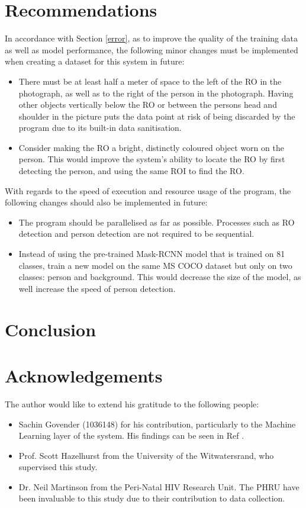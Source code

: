 \documentclass[conference]{IEEEtran}
\begin{document}
\section{Recommendations}
In accordance with Section \ref{error}, as to improve the quality of the training data as well as model performance, the following minor changes must be implemented when creating a dataset for this system in future:
\begin{itemize}
	\item There must be at least half a meter of space to the left of the RO in the photograph, as well as to the right of the person in the photograph.
	Having other objects vertically below the RO or between the persons head and shoulder in the picture puts the data point at risk of being discarded by the program due to its built-in data sanitisation.
	\item Consider making the RO a bright, distinctly coloured object worn on the person.
	This would improve the system's ability to locate the RO by first detecting the person, and using the same ROI to find the RO.
\end{itemize}
With regards to the speed of execution and resource usage of the program, the following changes should also be implemented in future:
\begin{itemize}
	\item The program should be parallelised as far as possible.
	Processes such as RO detection and person detection are not required to be sequential.
	\item Instead of using the pre-trained Mask-RCNN model that is trained on 81 classes, train a new model on the same MS COCO dataset but only on two classes: person and background.
	This would decrease the size of the model, as well increase the speed of person detection.
\end{itemize}

\section{Conclusion}

\section{Acknowledgements}
The author would like to extend his gratitude to the following people:
\begin{itemize}
    \item Sachin Govender (1036148) for his contribution, particularly to the Machine Learning layer of the system.
    His findings can be seen in Ref \cite{sachin}.
    \item Prof. Scott Hazelhurst from the University of the Witwatersrand, who supervised this study.
    \item Dr. Neil Martinson from the Peri-Natal HIV Research Unit.
    The PHRU have been invaluable to this study due to their contribution to data collection.
\end{itemize}



\end{document}
